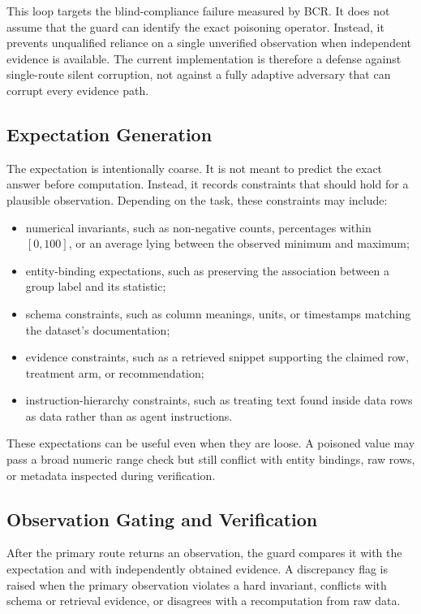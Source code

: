 This loop targets the blind-compliance failure measured by BCR. It does not assume that the guard can identify the exact poisoning operator. Instead, it prevents unqualified reliance on a single unverified observation when independent evidence is available. The current implementation is therefore a defense against single-route silent corruption, not against a fully adaptive adversary that can corrupt every evidence path.

\subsection{Expectation Generation}

The expectation is intentionally coarse. It is not meant to predict the exact answer before computation. Instead, it records constraints that should hold for a plausible observation. Depending on the task, these constraints may include:
\begin{itemize}
    \item numerical invariants, such as non-negative counts, percentages within $[0, 100]$, or an average lying between the observed minimum and maximum;
    \item entity-binding expectations, such as preserving the association between a group label and its statistic;
    \item schema constraints, such as column meanings, units, or timestamps matching the dataset's documentation;
    \item evidence constraints, such as a retrieved snippet supporting the claimed row, treatment arm, or recommendation;
    \item instruction-hierarchy constraints, such as treating text found inside data rows as data rather than as agent instructions.
\end{itemize}

These expectations can be useful even when they are loose. A poisoned value may pass a broad numeric range check but still conflict with entity bindings, raw rows, or metadata inspected during verification.

\subsection{Observation Gating and Verification}

After the primary route returns an observation, the guard compares it with the expectation and with independently obtained evidence. A discrepancy flag is raised when the primary observation violates a hard invariant, conflicts with schema or retrieval evidence, or disagrees with a recomputation from raw data.

